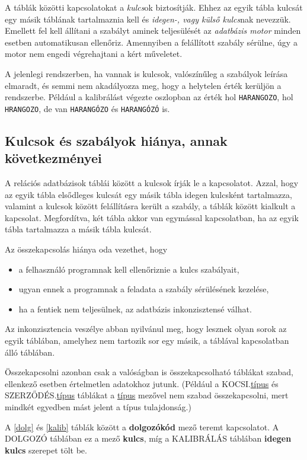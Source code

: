 \documentclass[a4paper,12pt]{report}
\newcommand{\tmezo}[2]{\MakeUppercase{#1}.{\underline{#2}}} %
\begin{document}
A táblák közötti kapcsolatokat a \textit{kulcs}ok biztosítják. Ehhez az egyik 
tábla kulcsát egy másik táblának tartalmaznia kell és \textit{idegen-, vagy 
külső kulcs}nak nevezzük. Emellett fel kell állítani a szabályt aminek 
teljesülését az \textit{adatbázis motor} minden esetben automatikusan ellenőriz. 
Amennyiben a felállított szabály sérülne, úgy a motor nem engedi végrehajtani a 
kért műveletet.

A jelenlegi rendszerben, ha vannak is kulcsok, valószínűleg a szabályok leírása 
elmaradt, és semmi nem akadályozza meg, hogy a helytelen érték kerüljön a 
rendszerbe. Például a kalibrálást végezte oszlopban az érték hol 
\texttt{HARANGOZO}, hol \texttt{HRANGOZO}, de van \texttt{HARANGÓZO} és 
\texttt{HARANGÓZÓ} is.

\subsection{Kulcsok és szabályok hiánya, annak következményei}
A relációs adatbázisok táblái között a kulcsok írják le a kapcsolatot. Azzal, 
hogy az egyik tábla elsődleges kulcsát egy másik tábla idegen kulcsként 
tartalmazza, valamint a kulcsok között felállításra került a szabály, a táblák 
között kialkult a kapcsolat. Megfordítva, két tábla akkor van egymással 
kapcsolatban, ha az egyik tábla tartalmazza a másik tábla kulcsát.

Az összekapcsolás hiánya oda vezethet, hogy
\begin{itemize}
\item a felhasználó programnak kell ellenőriznie a kulcs szabályait,
\item ugyan ennek a programnak a feladata a szabály sérülésének kezelése,
\item ha a fentiek nem teljesülnek, az adatbázis inkonzisztensé válhat.
\end{itemize}
Az inkonzisztencia veszélye abban nyilvánul meg, hogy lesznek olyan sorok az 
egyik táblában, amelyhez nem tartozik sor egy másik, a táblával kapcsolatban 
álló táblában.

Összekapcsolni azonban csak a valóságban is összekapcsolható táblákat szabad, ellenkező esetben értelmetlen adatokhoz jutunk. (Például a \tmezo{kocsi}{típus} és \tmezo{szerződés}{típus} táblákat a \underline{típus} mezővel nem szabad összekapcsolni, mert mindkét egyedben mást jelent a típus tulajdonság.)



A \ref{dolg} és \ref{kalib} táblák között a \textbf{dolgozókód} mező teremt
kapcsolatot. A DOLGOZÓ táblában ez a mező \textbf{kulcs}, míg a KALIBRÁLÁS 
táblában \textbf{idegen kulcs} szerepet tölt be.
\end{document}
